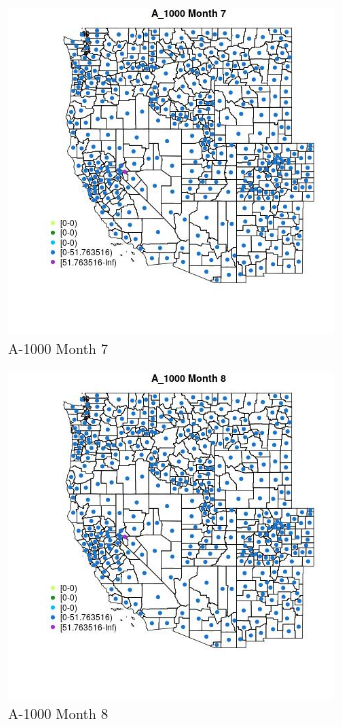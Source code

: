 \begin{figure} 
\centering  
\includegraphics[width=0.77\textwidth]{Code_Outputs/df_report_ML_predictors_CountyCentroid_Locations_Dates_2008-01-01to2018-12-31_MapObsMo7A_1000.jpg} 
\caption{\label{fig:df_report_ML_predictors_CountyCentroid_Locations_Dates_2008-01-01to2018-12-31MapObsMo7A_1000}A-1000 Month 7} 
\end{figure} 
 

\begin{figure} 
\centering  
\includegraphics[width=0.77\textwidth]{Code_Outputs/df_report_ML_predictors_CountyCentroid_Locations_Dates_2008-01-01to2018-12-31_MapObsMo8A_1000.jpg} 
\caption{\label{fig:df_report_ML_predictors_CountyCentroid_Locations_Dates_2008-01-01to2018-12-31MapObsMo8A_1000}A-1000 Month 8} 
\end{figure} 
 

